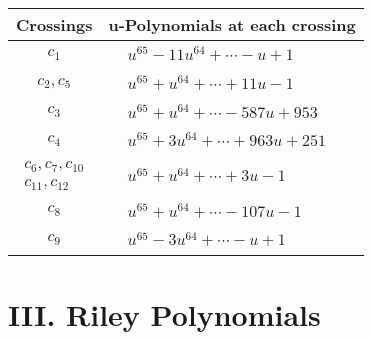 \documentclass[1p]{elsarticle_modified}
\theoremstyle{definition}
\begin{document}
\begin{tabular}{m{50pt}|m{274pt}}
Crossings & \hspace{64pt}u-Polynomials at each crossing \\
\hline $$\begin{aligned}c_{1}\end{aligned}$$&$\begin{aligned}
&u^{65}-11 u^{64}+\cdots- u+1
\end{aligned}$\\
\hline $$\begin{aligned}c_{2},c_{5}\end{aligned}$$&$\begin{aligned}
&u^{65}+u^{64}+\cdots+11 u-1
\end{aligned}$\\
\hline $$\begin{aligned}c_{3}\end{aligned}$$&$\begin{aligned}
&u^{65}+u^{64}+\cdots-587 u+953
\end{aligned}$\\
\hline $$\begin{aligned}c_{4}\end{aligned}$$&$\begin{aligned}
&u^{65}+3 u^{64}+\cdots+963 u+251
\end{aligned}$\\
\hline $$\begin{aligned}c_{6},c_{7},c_{10}\\c_{11},c_{12}\end{aligned}$$&$\begin{aligned}
&u^{65}+u^{64}+\cdots+3 u-1
\end{aligned}$\\
\hline $$\begin{aligned}c_{8}\end{aligned}$$&$\begin{aligned}
&u^{65}+u^{64}+\cdots-107 u-1
\end{aligned}$\\
\hline $$\begin{aligned}c_{9}\end{aligned}$$&$\begin{aligned}
&u^{65}-3 u^{64}+\cdots- u+1
\end{aligned}$\\
\hline
\end{tabular}\newpage\renewcommand{\arraystretch}{1}
\centering \section*{ III. Riley Polynomials}
\end{document}
